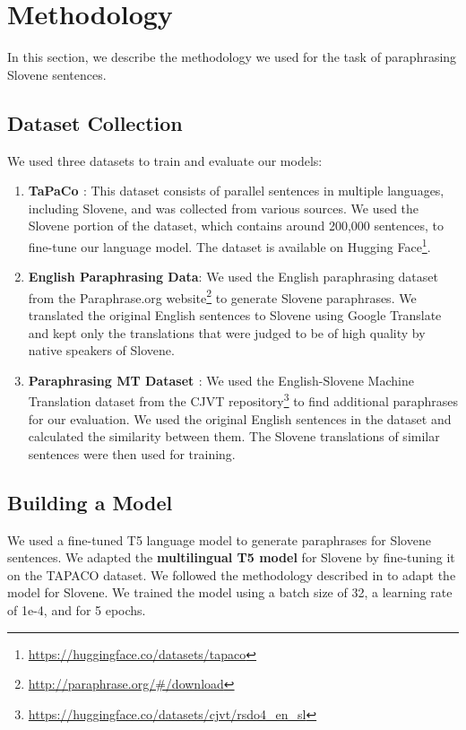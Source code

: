\documentclass[fleqn,moreauthors,10pt]{ds_report}
\begin{document}
\section*{Methodology}

In this section, we describe the methodology we used for the task of paraphrasing Slovene sentences.

\subsection*{Dataset Collection}

We used three datasets to train and evaluate our models:

\begin{enumerate}
\item \textbf{TaPaCo \cite{scherrer-2020-tapaco}}: This dataset consists of parallel sentences in multiple languages, including Slovene, and was collected from various sources. We used the Slovene portion of the dataset, which contains around 200,000 sentences, to fine-tune our language model. The dataset is available on Hugging Face\footnote{\url{https://huggingface.co/datasets/tapaco}}.

\item \textbf{English Paraphrasing Data}: We used the English paraphrasing dataset from the Paraphrase.org website\footnote{\url{http://paraphrase.org/\#/download}} to generate Slovene paraphrases. We translated the original English sentences to Slovene using Google Translate and kept only the translations that were judged to be of high quality by native speakers of Slovene.

\item \textbf{Paraphrasing MT Dataset \cite{rsdo4_en_sl}}: We used the English-Slovene Machine Translation dataset from the CJVT repository\footnote{\url{https://huggingface.co/datasets/cjvt/rsdo4_en_sl}} to find additional paraphrases for our evaluation. We used the original English sentences in the dataset and calculated the similarity between them. The Slovene translations of similar sentences were then used for training.

\end{enumerate}

\subsection*{Building a Model}

We used a fine-tuned T5 language model to generate paraphrases for Slovene sentences. We adapted the \textbf{multilingual T5 model} \cite{mT5-base} for Slovene by fine-tuning it on the TAPACO dataset. We followed the methodology described in \cite{dale2021howT5} to adapt the model for Slovene. We trained the model using a batch size of 32, a learning rate of 1e-4, and for 5 epochs.
\end{document}
